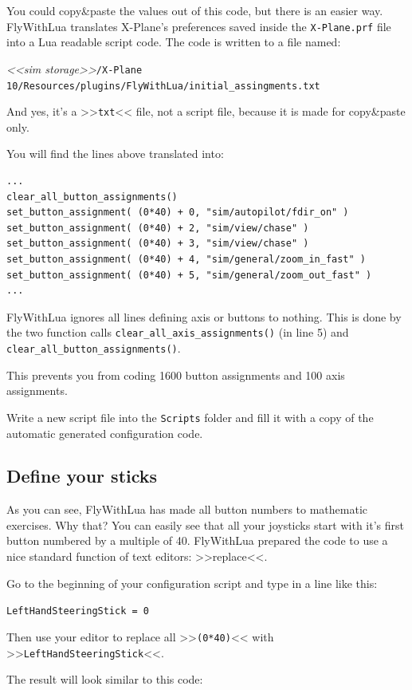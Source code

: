 \documentclass[11pt,parskip=half,a4paper]{scrartcl}
\begin{document}
You could copy\&paste the values out of this code, but there is an easier way. FlyWithLua translates X-Plane's preferences saved inside the \verb|X-Plane.prf| file into a Lua readable script code. The code is written to a file named:

\emph{<<sim storage>>}\verb|/X-Plane 10/Resources/plugins/FlyWithLua/initial_assingments.txt|

And yes, it's a >>\verb|txt|<< file, not a script file, because it is made for copy\&paste only.

You will find the lines above translated into:

\begin{lstlisting}[firstnumber=12]
...
clear_all_button_assignments()
set_button_assignment( (0*40) + 0, "sim/autopilot/fdir_on" )
set_button_assignment( (0*40) + 2, "sim/view/chase" )
set_button_assignment( (0*40) + 3, "sim/view/chase" )
set_button_assignment( (0*40) + 4, "sim/general/zoom_in_fast" )
set_button_assignment( (0*40) + 5, "sim/general/zoom_out_fast" )
...
\end{lstlisting}

FlyWithLua ignores all lines defining axis or buttons to nothing. This is done by the two function calls \verb|clear_all_axis_assignments()| (in line 5) and \verb|clear_all_button_assignments()|.

This prevents you from coding 1600 button assignments and 100 axis assignments.

Write a new script file into the \verb|Scripts| folder and fill it with a copy of the automatic generated configuration code.

\subsection{Define your sticks}

As you can see, FlyWithLua has made all button numbers to mathematic exercises. Why that? You can easily see that all your joysticks start with it's first button numbered by a multiple of 40. FlyWithLua prepared the code to use a nice standard function of text editors: >>replace<<.

Go to the beginning of your configuration script and type in a line like this:

\verb|LeftHandSteeringStick = 0|

Then use your editor to replace all >>\verb|(0*40)|<< with >>\verb|LeftHandSteeringStick|<<.

The result will look similar to this code:
\end{document}
